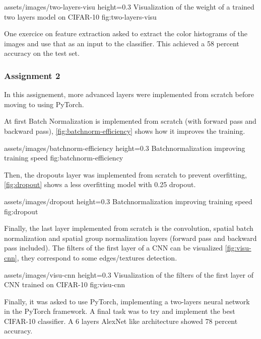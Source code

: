 \insertfigure
    {assets/images/two-layers-visu}
    {height=0.3\textheight}
    {Visualization of the weight of a trained two layers model on CIFAR-10}
    {fig:two-layers-visu}

One exercice on feature extraction asked to extract the color histograms of the
images and use that as an input to the classifier. This achieved a 58 percent
accuracy on the test set.

\subsubsection{Assignment 2}

In this assignement, more advanced layers were implemented from scratch before
moving to using PyTorch.

At first Batch Normalization is implemented from scratch (with forward pass and
backward pass), \cref{fig:batchnorm-efficiency} shows how it improves the
training.

\insertfigure
    {assets/images/batchnorm-efficiency}
    {height=0.3\textheight}
    {Batchnormalization improving training speed}
    {fig:batchnorm-efficiency}

Then, the dropouts layer was implemented from scratch to prevent overfitting,
\cref{fig:dropout} shows a less overfitting model with 0.25 dropout.

\insertfigure
    {assets/images/dropout}
    {height=0.3\textheight}
    {Batchnormalization improving training speed}
    {fig:dropout}

Finally, the last layer implemented from scratch is the convolution, spatial
batch normalization and spatial group normalization layers (forward pass and
backward pass included). The filters of the first layer of a CNN can be
visualized \cref{fig:visu-cnn}, they correspond to some edges/textures
detection.

\insertfigure
    {assets/images/visu-cnn}
    {height=0.3\textheight}
    {Visualization of the filters of the first layer of CNN trained on CIFAR-10}
    {fig:visu-cnn}

Finally, it was asked to use PyTorch, implementing a two-layers neural network
in the PyTorch framework. A final task was to try and implement the best
CIFAR-10 classifier. A 6 layers AlexNet like architecture showed 78 percent
accuracy. 